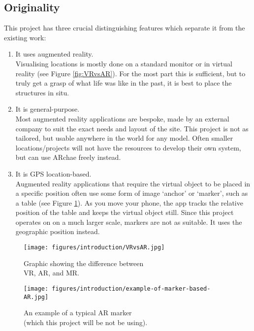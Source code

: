 \documentclass{article}
\begin{document}
\subsection{Originality}
This project has three crucial distinguishing features which separate it from the existing work:
\begin{enumerate}
    \item It uses augmented reality. \\
    Visualising locations is mostly done on a standard monitor or in virtual reality (see Figure \ref{fig:VRvsAR}). For the most part this is sufficient, but to truly get a grasp of what life was like in the past, it is best to place the structures in situ.
    \item It is general-purpose. \\
    Most augmented reality applications are bespoke, made by an external company to suit the exact needs and layout of the site. This project is not as tailored, but usable anywhere in the world for any model. Often smaller locations/projects will not have the resources to develop their own system, but can use ARchae freely instead.
    \item It is GPS location-based. \\
    Augmented reality applications that require the virtual object to be placed in a specific position often use some form of image `anchor' or `marker', such as a table (see Figure \ref{fig:ARmarker}). As you move your phone, the app tracks the relative position of the table and keeps the virtual object still. Since this project operates on on a much larger scale, markers are not as suitable. It uses the geographic position instead.

\end{enumerate}

\begin{figure}[H]
\centering
\begin{minipage}{.5\textwidth}
  \centering
  \texttt{[image: figures/introduction/VRvsAR.jpg]}
  \caption{Graphic showing the difference between \\ VR, AR, and MR. \cite{originality:arvrmr}}
  \label{fig:VRvsAR}
\end{minipage}%
\begin{minipage}{.5\textwidth}
  \centering
  \texttt{[image: figures/introduction/example-of-marker-based-AR.jpg]}
  \caption{An example of a typical AR marker \\ (which this project will be not be using). \cite{originality:armarker}}
  \label{fig:ARmarker}
\end{minipage}
\end{figure}
\end{document}
